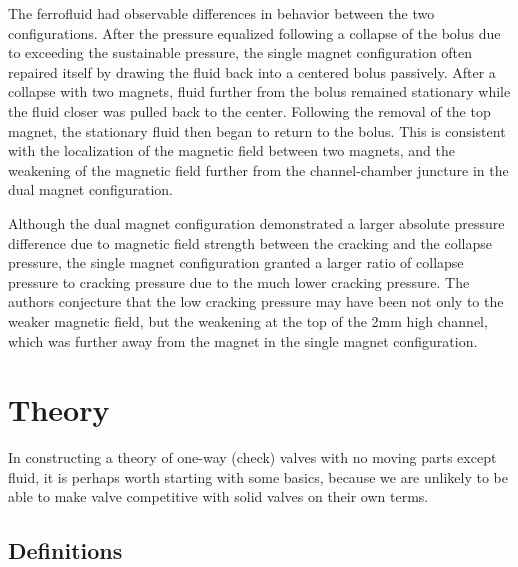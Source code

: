\documentclass{asme2ej}
\begin{document}
The ferrofluid had observable differences in behavior between the two
configurations.  After the pressure equalized
following a collapse of the bolus due to
exceeding the sustainable pressure, the single magnet
configuration often repaired itself by drawing the fluid back
into a centered bolus passively.
After a collapse with two magnets, fluid further from the bolus
remained stationary while the fluid closer was pulled back to the
center. Following the removal of the top magnet, the stationary fluid
then began to return to the bolus. This is consistent with the
localization of the magnetic field between two magnets, and the
weakening of the magnetic field further from the channel-chamber
juncture in the dual magnet configuration.

Although the dual magnet configuration demonstrated a larger absolute
pressure difference due to magnetic field strength between the
cracking and the collapse pressure, the single magnet configuration
granted a larger ratio of collapse pressure to cracking
pressure due to the much lower cracking pressure.
The authors conjecture that the low cracking pressure may have
been not only to the weaker magnetic field, but the weakening at the
top of the 2mm high channel, which was further away from the magnet
in the single magnet configuration.


\section{Theory}

In constructing a theory of one-way (check) valves with no moving parts except fluid,
it is perhaps worth starting with some basics, because we are unlikely to
be able to make valve competitive with solid valves on their own terms.

\subsection{Definitions}
\end{document}
